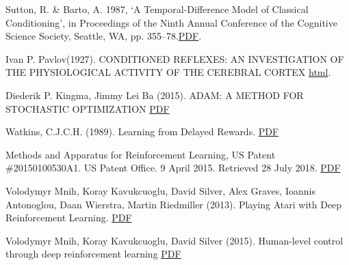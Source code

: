 \documentclass[a4paper, 12pt]{article}
\begin{document}
%





\newpage
{}


\begin{thebibliography}{99}

Sutton, R. \& Barto, A. 1987, ‘A Temporal-Difference Model of Classical Conditioning’, in Proceedings of the Ninth Annual Conference of the Cognitive Science Society, Seattle, WA, pp. 355–78.\href{http://incompleteideas.net/papers/sutton-barto-TD-87.pdf}{PDF}.

Ivan P. Pavlov(1927). CONDITIONED REFLEXES: AN INVESTIGATION OF THE PHYSIOLOGICAL ACTIVITY OF THE CEREBRAL CORTEX \href{http://psychclassics.yorku.ca/Pavlov/lecture6.htm}{html}.

Diederik P. Kingma, Jimmy Lei Ba (2015). ADAM: A METHOD FOR STOCHASTIC OPTIMIZATION
\href{https://arxiv.org/pdf/1412.6980.pdf}{PDF}


Watkins, C.J.C.H. (1989). Learning from Delayed Rewards. \href{https://www.cs.rhul.ac.uk/~chrisw/new_thesis.pdf}{PDF}

 Methods and Apparatus for Reinforcement Learning, US Patent \#20150100530A1. US Patent Office. 9 April 2015. Retrieved 28 July 2018. \href{https://patentimages.storage.googleapis.com/71/91/4a/c5cf4ffa56f705/US20150100530A1.pdf}{PDF}

Volodymyr Mnih, Koray Kavukcuoglu, David Silver, Alex Graves, Ioannis Antonoglou, Daan Wierstra, Martin Riedmiller (2013). Playing Atari with Deep Reinforcement Learning. \href{https://arxiv.org/pdf/1312.5602v1.pdf}{PDF}

Volodymyr Mnih, Koray Kavukcuoglu, David Silver (2015). Human-level control through deep reinforcement learning \href{https://storage.googleapis.com/deepmind-media/dqn/DQNNaturePaper.pdf}{PDF}


\end{thebibliography}
\end{document}
